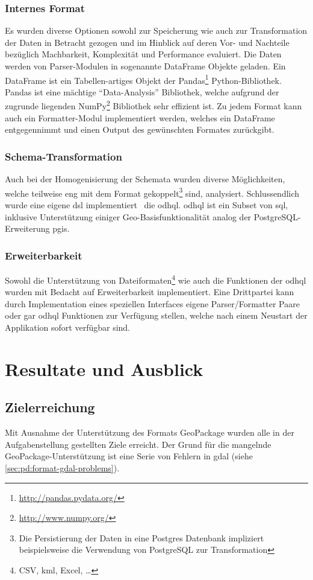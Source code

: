 \subsection{Internes Format}
Es wurden diverse Optionen sowohl zur Speicherung wie auch zur Transformation der Daten in Betracht gezogen und im Hinblick auf deren Vor- und Nachteile bezüglich Machbarkeit, Komplexität und Performance evaluiert. Die Daten werden von Parser-Modulen in sogenannte DataFrame Objekte geladen. 
Ein DataFrame ist ein Tabellen-artiges Objekt der Pandas\footnote{\url{http://pandas.pydata.org/}} Python-Bibliothek. Pandas ist eine mächtige ``Data-Analysis'' Bibliothek, welche aufgrund der zugrunde liegenden NumPy\footnote{\url{http://www.numpy.org/}} Bibliothek sehr effizient ist.
Zu jedem Format kann auch ein Formatter-Modul implementiert werden, welches ein DataFrame entgegennimmt und einen Output des gewünschten Formates zurückgibt.

\subsection{Schema-Transformation}
Auch bei der Homogenisierung der Schemata wurden diverse Möglichkeiten, welche teilweise eng mit dem Format gekoppelt\footnote{Die Persistierung der Daten in eine Postgres Datenbank impliziert beispielsweise die Verwendung von PostgreSQL zur Transformation} sind, analysiert. Schlussendlich wurde eine eigene \gls{dsl} implementiert \textendash\ die \acf{odhql}. \acs{odhql} ist ein Subset von \acs{sql}, inklusive Unterstützung einiger Geo-Basisfunktionalität analog der PostgreSQL-Erweiterung \gls{pgis}.

\subsection{Erweiterbarkeit}
Sowohl die Unterstützung von Dateiformaten\footnote{CSV, \acs{kml}, Excel, \dots} wie auch die Funktionen der \acl{odhql} wurden mit Bedacht auf Erweiterbarkeit implementiert. Eine Drittpartei kann durch Implementation eines speziellen Interfaces eigene Parser/Formatter Paare oder gar \gls{odhql} Funktionen zur Verfügung stellen, welche nach einem Neustart der Applikation sofort verfügbar sind.


\chapter{Resultate und Ausblick} \label{sec:tb:results}
\section{Zielerreichung}
Mit Ausnahme der Unterstützung des Formats GeoPackage wurden alle in der Aufgabenstellung gestellten Ziele erreicht. Der Grund für die mangelnde GeoPackage-Unterstützung ist eine Serie von Fehlern in \gls{gdal} (siehe \vref{sec:pd:format-gdal-problems}).

